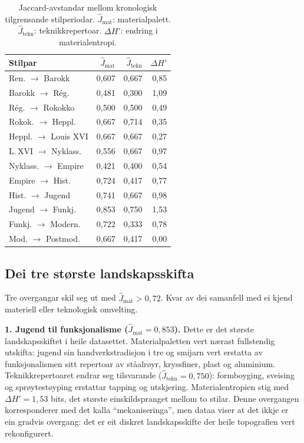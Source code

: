 \documentclass[10pt, a4paper, twocolumn]{article}
\begin{document}
\begin{table}[H]
\centering
\caption{Jaccard-avstandar mellom kronologisk tilgrensande stilperiodar. $\hat{J}_{\text{mat}}$: materialpalett. $\hat{J}_{\text{tekn}}$: teknikkrepertoar. $\Delta H'$: endring i materialentropi.}
\label{tab:jaccard}
\begin{tabular}{lrrr}
\toprule
\textbf{Stilpar} & $\hat{J}_{\text{mat}}$ & $\hat{J}_{\text{tekn}}$ & $\Delta H'$ \\
\midrule
Ren. $\rightarrow$ Barokk         & 0,607 & 0,667 & 0,85 \\
Barokk $\rightarrow$ R\'{e}g.     & 0,481 & 0,300 & 1,09 \\
R\'{e}g. $\rightarrow$ Rokokko    & 0,500 & 0,500 & 0,49 \\
Rokok. $\rightarrow$ Heppl.       & 0,667 & 0,714 & 0,35 \\
Heppl. $\rightarrow$ Louis XVI    & 0,667 & 0,667 & 0,27 \\
L.\,XVI $\rightarrow$ Nyklass.    & 0,556 & 0,667 & 0,97 \\
Nyklass. $\rightarrow$ Empire     & 0,421 & 0,400 & 0,54 \\
Empire $\rightarrow$ Hist.        & 0,724 & 0,417 & 0,77 \\
Hist. $\rightarrow$ Jugend        & 0,741 & 0,667 & 0,98 \\
Jugend $\rightarrow$ Funkj.       & 0,853 & 0,750 & 1,53 \\
Funkj. $\rightarrow$ Modern.      & 0,722 & 0,333 & 0,78 \\
Mod. $\rightarrow$ Postmod.       & 0,667 & 0,417 & 0,00 \\
\bottomrule
\end{tabular}
\end{table}


\subsection{Dei tre st\o rste landskapsskifta}

Tre overgangar skil seg ut med $\hat{J}_{\text{mat}} > 0{,}72$. Kvar av dei samanfell med ei kjend materiell eller teknologisk omvelting.

\textbf{1. Jugend til funksjonalisme ($\hat{J}_{\text{mat}} = 0{,}853$).} Dette er det st\o rste landskapsskiftet i heile datasettet. Materialpaletten vert n\ae rast fullstendig utskifta: jugend sin handverkstradisjon i tre og smijarn vert erstatta av funksjonalismen sitt repertoar av st\r{a}alr\o yr, kryssfiner, plast og aluminium. Teknikkrepertoaret endrar seg tilsvarande ($\hat{J}_{\text{tekn}} = 0{,}750$): formboyging, sveising og spr\o ytest\o yping erstattar tapping og utskjering. Materialentropien stig med $\Delta H' = 1{,}53$ bits, det st\o rste einskildspranget mellom to stilar. Denne overgangen korresponderer med det \citet{giedion1948} kalla ``mekaniseringa'', men dataa viser at det ikkje er ein gradvis overgang: det er eit diskret landskapsskifte der heile topografien vert rekonfigurert.
\end{document}
